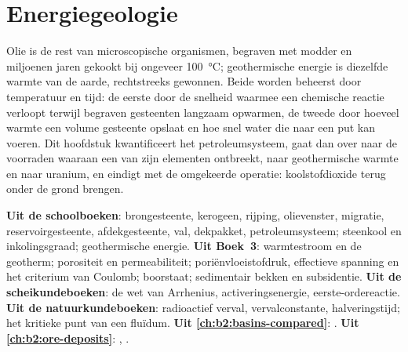 \chapter{Energiegeologie}\label{ch:b2:energy-geology}

Olie is de rest van microscopische organismen, begraven met modder en miljoenen jaren gekookt bij
ongeveer \qty{100}{\celsius}; geothermische energie is diezelfde warmte van de aarde, rechtstreeks gewonnen.
Beide worden beheerst door temperatuur en tijd: de eerste door de snelheid waarmee een chemische reactie verloopt terwijl
begraven gesteenten langzaam opwarmen, de tweede door hoeveel warmte een volume gesteente opslaat en hoe snel water
die naar een put kan voeren. Dit hoofdstuk kwantificeert het petroleumsysteem, gaat dan over naar de voorraden waaraan
een van zijn elementen ontbreekt, naar geothermische warmte en naar uranium, en eindigt met de omgekeerde operatie:
koolstofdioxide terug onder de grond brengen.

\begin{recall}
\textbf{Uit de schoolboeken}: brongesteente, kerogeen, rijping, olievenster, migratie,
reservoirgesteente, afdekgesteente, val, dekpakket, petroleumsysteem; steenkool en inkolingsgraad; geothermische energie.
\textbf{Uit Boek~3}: warmtestroom en de geotherm; porositeit en permeabiliteit;
poriënvloeistofdruk, effectieve spanning en het criterium van Coulomb; boorstaat; sedimentair bekken en
subsidentie. \textbf{Uit de scheikundeboeken}: de wet van Arrhenius, activeringsenergie,
eerste-ordereactie. \textbf{Uit de natuurkundeboeken}: radioactief verval, vervalconstante, halveringstijd; het
kritieke punt van een fluïdum. \textbf{Uit \cref{ch:b2:basins-compared}}: .
\textbf{Uit \cref{ch:b2:ore-deposits}}: , .
\end{recall}

